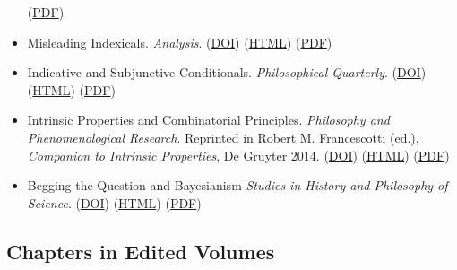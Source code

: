 \documentclass[
  10pt,
  letterpaper,
  DIV=11,
  numbers=noendperiod,
  twoside]{scrartcl}
\begin{document}
\begin{itemize}
  (\href{./posts/kuir/Keynes,\%20Uncertainty\%20and\%20Interest\%20Rates.pdf}{PDF})
\item
  Misleading Indexicals. \emph{Analysis}.
  (\href{http://dx.doi.org/10.1093/analys/62.4.308}{DOI})
  (\href{./posts/misindex/misleading-indexicals.html}{HTML})
  (\href{./posts/misindex/Misleading\%20Indexicals.pdf}{PDF})
\item
  Indicative and Subjunctive Conditionals. \emph{Philosophical
  Quarterly}.
  (\href{http://dx.doi.org/10.1111/j.0031-8094.2001.00224.x}{DOI})
  (\href{./posts/indsub/indicative-and-subjunctive-conditionals.html}{HTML})
  (\href{./posts/indsub/Indicative\%20and\%20Subjunctive\%20Conditionals.pdf}{PDF})
\item
  Intrinsic Properties and Combinatorial Principles. \emph{Philosophy
  and Phenomenological Research}. Reprinted in Robert M. Francescotti
  (ed.), \emph{Companion to Intrinsic Properties}, De Gruyter 2014.
  (\href{http://dx.doi.org/10.1111/j.1933-1592.2001.tb00110.x}{DOI})
  (\href{./posts/ipacp/intrinsic-properties-and-combinatorial-principles.html}{HTML})
  (\href{./posts/ipacp/Intrinsic\%20Properties\%20and\%20Combinatorial\%20Principles.pdf}{PDF})
\item
  Begging the Question and Bayesianism \emph{Studies in History and
  Philosophy of Science}.
  (\href{http://dx.doi.org/10.1111/j.0031-8094.2001.00224.x}{DOI})
  (\href{./posts/bqb/begging-the-question-and-bayesians.html}{HTML})
  (\href{./posts/bqb/Begging\%20the\%20Question\%20and\%20Bayesianism.pdf}{PDF})
\end{itemize}

\subsection{Chapters in Edited
Volumes}\label{chapters-in-edited-volumes}
\end{document}
